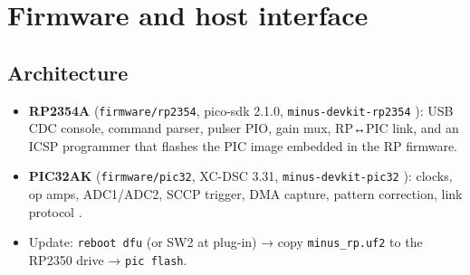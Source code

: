 \documentclass[10pt,a4paper]{article}
\newcommand{\cmd}[1]{\texttt{#1}}
\begin{document}
\section{Firmware and host interface}
\subsection{Architecture}
\begin{itemize}
  \item \textbf{RP2354A} (\texttt{firmware/rp2354}, pico-sdk 2.1.0, \cmd{minus-devkit-rp2354} \vrpfw): USB CDC console, command parser,
        pulser PIO, gain mux, RP↔PIC link, and an ICSP programmer that flashes the PIC image embedded in the RP firmware.
  \item \textbf{PIC32AK} (\texttt{firmware/pic32}, XC-DSC 3.31, \cmd{minus-devkit-pic32} \vpicfw): clocks, op amps, ADC1/ADC2, SCCP
        trigger, DMA capture, pattern correction, link protocol \vproto.
  \item Update: \cmd{reboot dfu} (or SW2 at plug-in) → copy \texttt{minus\_rp.uf2} to the RP2350 drive → \cmd{pic flash}.
\end{itemize}
\end{document}
